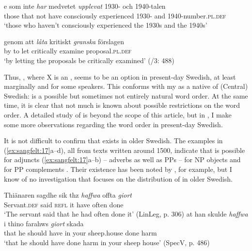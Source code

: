 \documentclass[output=paper, colorlinks, citecolor=brown]{langscibook}
\begin{document}
\ea {}\label{ex:sangfelt:16}
\ea\label{ex:sangfelt:16a}
\gll [d]e som inte \textit{har} {medvetet} \textit{upplevat } 1930- och 1940-talen \\
 those that not have consciously experienced 1930- and 1940-number\textsc{.pl.def}\\
\glt ‘those who haven’t consciously experienced the 1930s and the 1940s’

\ex\label{ex:sangfelt:16b}
\gll genom att \textit{låta} {kritiskt} \textit{granska} förslagen \\
 by to let critically examine proposal.\textsc{pl.def}\\
 \glt ‘by letting the proposals be critically examined’ (\citealt{TelemanEtAl1999}/3: 488)\\
\z
\z

Thus, , where X is an , seems to be an option in present-day Swedish, at least marginally and for some speakers. This conforms with my  as a native  of (Central) Swedish:  is a possible but sometimes not entirely natural word order. At the same time, it is clear that not much is known about possible restrictions on the word order. A detailed study of  is beyond the scope of this article, but in , I make some more observations regarding the word order in present-day Swedish.

It is not difficult to confirm that  exists in older Swedish. The examples in (\ref{ex:sangfelt:17}a–d), all from texts written around 1500, indicate that  is possible for adjuncts (\ref{ex:sangfelt:17}a–b) – adverbs as well as PPs – for NP objects  and for PP complements . Their existence has been noted by \citet[171--172]{Falk1993}, for example, but I know of no investigation that focuses on the distribution of  in older Swedish.


\ea {}\label{ex:sangfelt:17}
\ea\label{ex:sangfelt:17a}
\gll Thiänaren sagdhe sik thz \textit{haffwa} {offta} \textit{giort} \\
 Servant.\textsc{def} said \textsc{refl} it have often done\\
\glt ‘The servant said that he had often done it’ (LinLeg, p. 306)
\ex\label{ex:sangfelt:17b}
\gll at han skulde \textit{haffwa} i {thino} {farahws} \textit{giort} skada \\
 that he should have in your sheep.house done harm\\
\glt ‘that he should have done harm in your sheep house’ (SpecV, p. 486)
\end{document}
